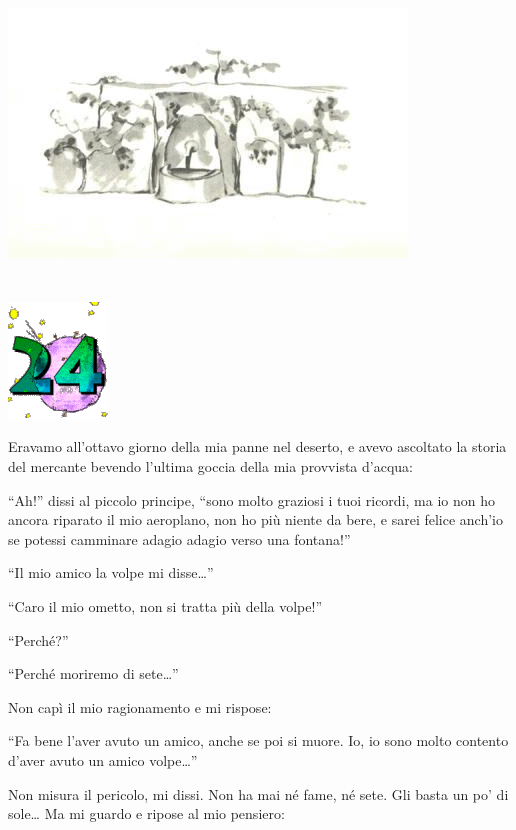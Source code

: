 \documentclass[11pt]{scrbook}
\begin{document}
\begin{center}
\includegraphics{img/studanka}
\end{center}

\chapter{}
\begin{center}
\includegraphics{img/chapter24}
\end{center}

Eravamo all'ottavo giorno della mia panne nel deserto, e avevo ascoltato la storia del mercante bevendo l'ultima goccia della mia provvista d'acqua:

``Ah!'' dissi al piccolo principe, ``sono molto graziosi i tuoi ricordi, ma io non ho ancora riparato il mio aeroplano, non ho più niente da bere, e sarei felice anch'io se potessi camminare adagio adagio verso una fontana!''

``Il mio amico la volpe mi disse\ldots{}''

``Caro il mio ometto, non si tratta più della volpe!''

``Perché?''

``Perché moriremo di sete\ldots{}''

Non capì il mio ragionamento e mi rispose:

``Fa bene l'aver avuto un amico, anche se poi si muore. Io, io sono molto contento d'aver avuto un amico volpe\ldots{}''

Non misura il pericolo, mi dissi. Non ha mai né fame, né sete. Gli basta un po' di sole\ldots{} Ma mi guardo e ripose al mio pensiero:
\end{document}
